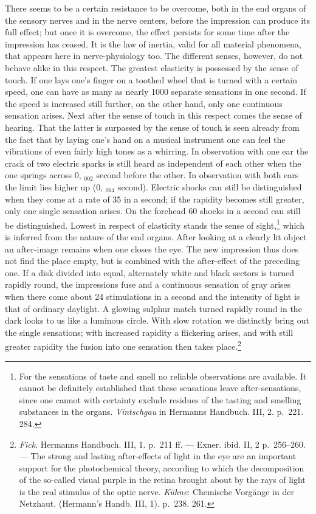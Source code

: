 \documentclass[12pt,a4paper]{book}
\newcommand{\opage}[1]{\marginnote{\footnotesize\textit{[#1]}}}
\begin{document}
There seems to be a certain resistance to be overcome, both in the end
organs of the sensory nerves and in the nerve centers, before the
impression can produce its full effect; but once it is overcome, the
effect persists for some time after the impression has ceased. It is the
law of inertia, valid for all material phenomena, that appears here in
nerve-physiology too. The different senses, however, do not behave
alike in this respect. The greatest elasticity is possessed by the sense
of touch. If one lays one's finger on a toothed wheel that is turned
with a certain speed, one can have as many as nearly 1000 separate
sensations in one second. If the speed is increased still further, on
the other hand, only one continuous sensation arises. Next after the
sense of touch in this respect comes the sense of hearing. That the
latter is surpassed by the sense of touch is seen already from the fact
that by laying one's hand on a musical instrument one can feel the
vibrations of even fairly high tones as a whirring. In observation with
one ear the crack of two electric sparks is still heard as independent
of each other when the one springs across 0, $_{002}$ second before the
other. In observation with both ears the limit lies higher up (0,
$_{064}$ second). Electric shocks can still be distinguished when they
come at a rate of 35 in a second; if the rapidity becomes still greater,
only one single sensation arises. On the forehead 60 shocks in a second
can still be distinguished. Lowest in respect of elasticity stands the
sense of sight,\footnote{For the sensations of taste and smell no
reliable observations are available. It cannot be definitely
established that these sensations leave after-sensations, since one
cannot with certainty exclude residues of the tasting and smelling
substances in the organs. \emph{Vintschgau} in Hermanns Handbuch. III,
2. p.~221. 284.} which is inferred from the nature of the end organs.
After looking at a clearly lit object
\opage{129}an after-image remains when one closes the eye. The new
impression thus does not find the place empty, but is combined with the
after-effect of the preceding one. If a disk divided into equal,
alternately white and black sectors is turned rapidly round, the
impressions fuse and a continuous sensation of gray arises when there
come about 24 stimulations in a second and the intensity of light is
that of ordinary daylight. A glowing sulphur match turned rapidly round
in the dark looks to us like a luminous circle. With slow rotation we
distinctly bring out the single sensations; with increased rapidity a
flickering arises, and with still greater rapidity the fusion into one
sensation then takes place.\footnote{\emph{Fick}. Hermanns Handbuch.
III, 1. p.~211 ff. --- Exner. ibid. II, 2 p.~256--260. --- The strong
and lasting after-effects of light in the eye are an important support
for the photochemical theory, according to which the decomposition of
the so-called visual purple in the retina brought about by the rays of
light is the real stimulus of the optic nerve. \emph{Kühne}: Chemische
Vorgänge in der Netzhaut. (Hermann’s Handb. III, 1). p.~238. 261.}
\end{document}
